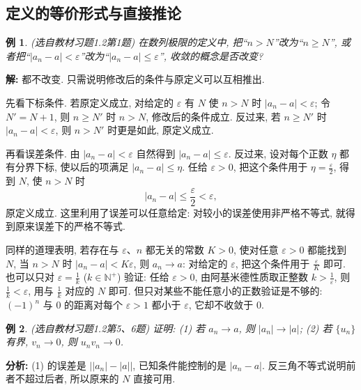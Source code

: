 \documentclass[UTF8,openany]{ctexbook}
\theoremstyle{chinesetextbook}
\newtheorem{example}{例}[section]
\newenvironment{cnsolution}{\par\indent\textbf{解:} \ignorespaces}{\par}
\begin{document}
\subsection{定义的等价形式与直接推论}
\begin{example}
\textnormal{(选自教材习题1.2第1题)} 在数列极限的定义中, 把“$n>N$”改为“$n\ge N$”, 或者把“$|a_n-a|<\varepsilon$”改为“$|a_n-a|\le\varepsilon$”, 收敛的概念是否改变?
\end{example}
\begin{cnsolution}
都不改变. 只需说明修改后的条件与原定义可以互相推出.

先看下标条件. 若原定义成立, 对给定的 $\varepsilon$ 有 $N$ 使 $n>N$ 时 $|a_n-a|<\varepsilon$; 令 $N'=N+1$, 则 $n\ge N'$ 时 $n>N$, 修改后的条件成立. 反过来, 若 $n\ge N'$ 时 $|a_n-a|<\varepsilon$, 则 $n>N'$ 时更是如此, 原定义成立.

再看误差条件. 由 $|a_n-a|<\varepsilon$ 自然得到 $|a_n-a|\le\varepsilon$. 反过来, 设对每个正数 $\eta$ 都有分界下标, 使以后的项满足 $|a_n-a|\le\eta$. 任给 $\varepsilon>0$, 把这个条件用于 $\displaystyle\eta=\frac\varepsilon2$, 得到 $N$, 使 $n>N$ 时
\[
|a_n-a|\le\frac\varepsilon2<\varepsilon,
\]
原定义成立. 这里利用了误差可以任意给定: 对较小的误差使用非严格不等式, 就得到原来误差下的严格不等式.
\end{cnsolution}
同样的道理表明, 若存在与 $\varepsilon$、$n$ 都无关的常数 $K>0$, 使对任意 $\varepsilon>0$ 都能找到 $N$, 当 $n>N$ 时 $|a_n-a|<K\varepsilon$, 则 $a_n\to a$: 对给定的 $\varepsilon$, 把这个条件用于 $\displaystyle\frac\varepsilon K$ 即可. 也可以只对 $\displaystyle\varepsilon=\frac1k$ ($k\in\mathbb N^+$) 验证: 任给 $\varepsilon>0$, 由阿基米德性质取正整数 $\displaystyle k>\frac1\varepsilon$, 则 $\displaystyle\frac1k<\varepsilon$, 用与 $\displaystyle\frac1k$ 对应的 $N$ 即可. 但只对某些不能任意小的正数验证是不够的: $(-1)^n$ 与 $0$ 的距离对每个 $\varepsilon>1$ 都小于 $\varepsilon$, 它却不收敛于 $0$.
\begin{example}
\textnormal{(选自教材习题1.2第5、6题)} 证明: (1) 若 $a_n\to a$, 则 $|a_n|\to|a|$; (2) 若 $\{u_n\}$ 有界, $v_n\to0$, 则 $u_nv_n\to0$.
\end{example}
\par\indent\textbf{分析:} (1) 的误差是 $\bigl||a_n|-|a|\bigr|$, 已知条件能控制的是 $|a_n-a|$. 反三角不等式说明前者不超过后者, 所以原来的 $N$ 直接可用.
\end{document}
